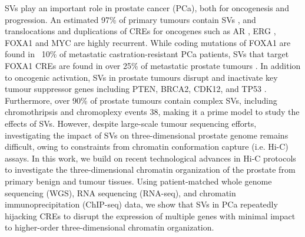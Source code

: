 SVs play an important role in prostate cancer (PCa), both for oncogenesis and progression.
An estimated 97\% of primary tumours contain SVs \cite{liPatternsSomaticStructural2020,fraserGenomicHallmarksLocalized2017}, and translocations and duplications of CREs for oncogenes such as AR \cite{takedaSomaticallyAcquiredEnhancer2018}, ERG \cite{rosenClinicalPotentialERG2012}, FOXA1 \cite{quigleyGenomicHallmarksStructural2018,paroliaDistinctStructuralClasses2019} and MYC \cite{paroliaDistinctStructuralClasses2019} are highly recurrent.
While coding mutations of FOXA1 are found in ~10\% of metastatic castration-resistant PCa patients, SVs that target FOXA1 CREs are found in over 25\% of metastatic prostate tumours \cite{paroliaDistinctStructuralClasses2019}.
In addition to oncogenic activation, SVs in prostate tumours disrupt and inactivate key tumour suppressor genes including PTEN, BRCA2, CDK12, and TP53 \cite{quigleyGenomicHallmarksStructural2018,abeshouseMolecularTaxonomyPrimary2015}.
Furthermore, over 90\% of prostate tumours contain complex SVs, including chromothripsis and chromoplexy events 38, making it a prime model to study the effects of SVs.
However, despite large-scale tumour sequencing efforts, investigating the impact of SVs on three-dimensional prostate genome remains difficult, owing to constraints from chromatin conformation capture (i.e. Hi-C) assays.
In this work, we build on recent technological advances in Hi-C protocols to investigate the three-dimensional chromatin organization of the prostate from primary benign and tumour tissues.
Using patient-matched whole genome sequencing (WGS), RNA sequencing (RNA-seq), and chromatin immunoprecipitation (ChIP-seq) data, we show that SVs in PCa repeatedly hijacking CREs to disrupt the expression of multiple genes with minimal impact to higher-order three-dimensional chromatin organization.
